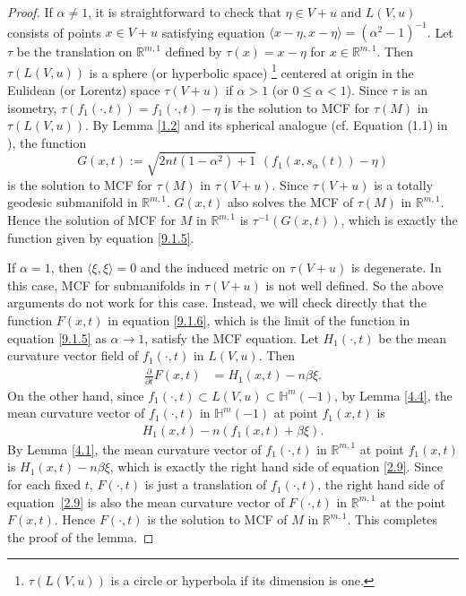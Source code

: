 \documentclass[12pt]{article}
\begin{document}
\begin{proof}
If $\alpha \neq 1$, it is straightforward to check that $\eta \in V + u$ and $L(V, u)$ consists of points $x \in V+u$ satisfying equation
$ \langle x-\eta, x-\eta\rangle = (\alpha^2-1)^{-1}. $
Let $\tau$ be the translation on $\mathbb R^{m,1}$ defined by $\tau(x)=x-\eta$ for $x\in \mathbb R^{m,1}$.
Then $\tau(L(V, u))$ is a sphere (or hyperbolic space)  \footnote{$\tau(L(V, u))$ is a circle or hyperbola if its dimension is one.}
centered at origin in the Eulidean (or Lorentz) space
$\tau(V+u)$ if $\alpha > 1$ (or $0 \leq \alpha < 1$).
Since $\tau$ is an isometry, $\tau(f_{1}(\cdot,t))=f_{1}(\cdot,t)-\eta$ is the solution to MCF for $\tau(M)$ in $\tau(L(V,u))$. By Lemma \ref{1.2}  and its spherical analogue (cf. Equation (1.1) in \cite{X.C}), the function
\[ G(x, t) := \sqrt{2nt(1-\alpha^2)+1}\, \, (f_1(x,s_{\alpha}(t))-\eta)\]
 is the solution to MCF for $\tau(M)$ in $\tau(V+u)$. Since $\tau(V+u)$ is a totally geodesic submanifold in $\mathbb R^{m,1}$. $G(x, t)$ also solves the MCF of $\tau(M)$ in $\mathbb R^{m,1}$.
 Hence the solution of MCF for $M$ in $\mathbb R^{m,1}$ is $\tau^{-1}(G(x,t))$, which is exactly the
 function given by equation \eqref{9.1.5}.

If $\alpha=1$, then $\langle \xi, \xi \rangle =0$ and the induced metric on $\tau(V+u)$ is degenerate. In this case, MCF for submanifolds in $\tau(V+u)$ is not well defined. So the above arguments do not work for this case.
Instead, we will check directly that the function $F(x, t)$ in equation \eqref{9.1.6}, which is the limit of the function in
equation \eqref{9.1.5} as $\alpha \rightarrow 1$, satisfy the MCF equation.
Let $H_1(\cdot,t)$ be the mean curvature vector field of $f_1(\cdot,t)$ in $L(V,u)$. Then
\begin{align}
\frac{\partial}{\partial t}F(x,t)
&=H_{1}(x,t)-n\beta\xi.\label{2.9}
\end{align}
On the other hand, since $f_1(\cdot ,t)\subset L(V,u) \subset \mathbb{H}^{m}(-1)$,
by Lemma \ref{4.4}, the mean curvature vector of $f_1(\cdot ,t)$ in $\mathbb{H}^{m}(-1)$ at point $f_1(x,t)$ is
		 \begin{align*}
		 	H_1(x,t) -n(f_1(x,t)+\beta \xi).
		 \end{align*}
By Lemma \ref{4.1},
the mean curvature vector of $f_1(\cdot ,t)$ in $\mathbb R^{m,1}$ at point $f_1(x,t)$ is
$ H_1(x,t)- n \beta \xi$,
which is exactly the right hand side of equation \eqref{2.9}.
Since for each fixed $t$, $F(\cdot, t)$ is just a translation of $f_{1}(\cdot, t)$,
the right hand side of equation~\eqref{2.9} is also the mean curvature vector of
$F(\cdot,t)$  in $\mathbb R^{m,1}$ at the point $F(x,t)$.
Hence $F(\cdot, t)$ is the solution to MCF of $M$ in $\mathbb R^{m,1}$.
This completes the proof of the lemma.
\end{proof}
\end{document}
